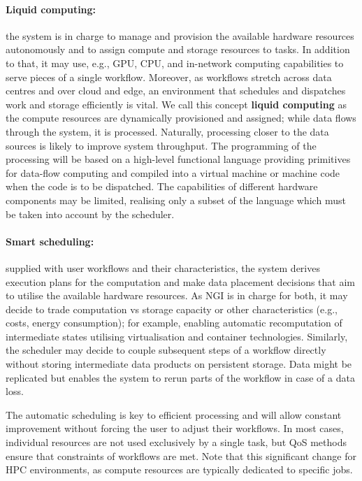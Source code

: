 \documentclass[a4paper, twocolumn]{article}
\begin{document}
\paragraph{Liquid computing:}
the system is in charge to manage and provision the available hardware resources autonomously and to assign compute and storage resources to tasks.
In addition to that, it may use, e.g., GPU, CPU, and in-network computing capabilities to serve pieces of a single workflow.
Moreover, as workflows stretch across data centres and over cloud and edge, an environment that schedules and dispatches work and storage efficiently is vital.
We call this concept \textbf{liquid computing} as the compute resources are dynamically provisioned and assigned; while data flows through the system, it is processed.
Naturally, processing closer to the data sources is likely to improve system throughput.
The programming of the processing will be based on a high-level functional language providing primitives for data-flow computing and compiled into a virtual machine or machine code when the code is to be dispatched.
The capabilities of different hardware components may be limited, realising only a subset of the language which must be taken into account by the scheduler.


\paragraph{Smart scheduling:}
supplied with user workflows and their characteristics, the system derives execution plans for the computation and make data placement decisions that aim to utilise the available hardware resources.
As NGI is in charge for both, it may decide to trade computation vs storage capacity or other characteristics (e.g., costs, energy consumption); for example, enabling automatic recomputation of intermediate states utilising virtualisation and container technologies.
Similarly, the scheduler may decide to couple subsequent steps of a workflow directly without storing intermediate data products on persistent storage.
Data might be replicated but enables the system to rerun parts of the workflow in case of a data loss.

The automatic scheduling is key to efficient processing and will allow constant improvement without forcing the user to adjust their workflows.
In most cases, individual resources are not used exclusively by a single task, but QoS methods ensure that constraints of workflows are met.
Note that this significant change for HPC environments, as compute resources are typically dedicated to specific jobs.
\end{document}
